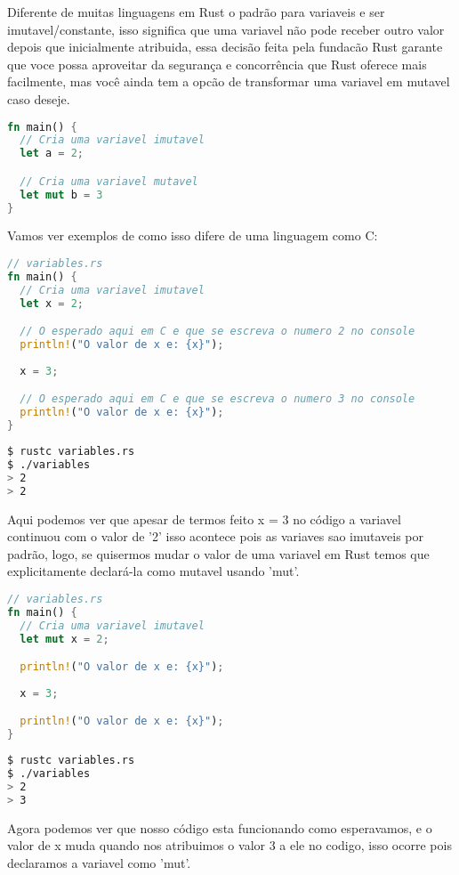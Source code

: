 Diferente de muitas linguagens em Rust o padrão para variaveis e ser imutavel/constante, isso significa que uma variavel não pode receber outro valor depois que inicialmente atribuida, essa decisão feita pela fundacão Rust garante que voce possa aproveitar da segurança e concorrência que Rust oferece mais facilmente, mas você ainda tem a opcão de transformar uma variavel em mutavel caso deseje.
\par
\begin{lstlisting}[language=rust]
fn main() {
  // Cria uma variavel imutavel
  let a = 2; 

  // Cria uma variavel mutavel
  let mut b = 3 
}
\end{lstlisting}
\pagebreak
\newpage
Vamos ver exemplos de como isso difere de uma linguagem como C:
\begin{lstlisting}[language=rust]
// variables.rs
fn main() {
  // Cria uma variavel imutavel
  let x = 2; 

  // O esperado aqui em C e que se escreva o numero 2 no console
  println!("O valor de x e: {x}");
  
  x = 3;

  // O esperado aqui em C e que se escreva o numero 3 no console
  println!("O valor de x e: {x}");
}
\end{lstlisting}
\begin{lstlisting}[language=bash]
$ rustc variables.rs
$ ./variables
> 2
> 2
\end{lstlisting}
\par
Aqui podemos ver que apesar de termos feito x = 3 no código a variavel continuou com o valor de '2' isso acontece pois as variaves sao imutaveis por padrão, logo, se quisermos mudar o valor de uma variavel em Rust temos que explicitamente declará-la como mutavel usando 'mut'.
\begin{lstlisting}[language=rust]
// variables.rs
fn main() {
  // Cria uma variavel imutavel
  let mut x = 2; 

  println!("O valor de x e: {x}");
  
  x = 3;

  println!("O valor de x e: {x}");
}
\end{lstlisting}
\begin{lstlisting}[language=bash]
$ rustc variables.rs
$ ./variables
> 2
> 3
\end{lstlisting}
\par
Agora podemos ver que nosso código esta funcionando como esperavamos, e o valor de x muda quando nos atribuimos o valor 3 a ele no codigo, isso ocorre pois declaramos a variavel como 'mut'.
\pagebreak
\newpage

